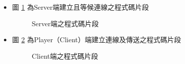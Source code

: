 \documentclass[12pt]{article}  %
\theoremstyle{plain}
\begin{document}
\begin{itemize}
\item 圖 \ref{Server端之程式碼片段} 為Server端建立且等候連線之程式碼片段
\begin{figure}[htbp]
\quad
{}
\caption{Server端之程式碼片段} \label{Server端之程式碼片段}
\end{figure}
\newpage

\item 圖 \ref{Client端之程式碼片段} 為Player（Client）端建立連線及傳送之程式碼片段
\begin{figure}[htbp]
\quad
{}
\caption{Client端之程式碼片段} \label{Client端之程式碼片段}
\end{figure}
\end{itemize}
\end{document}
